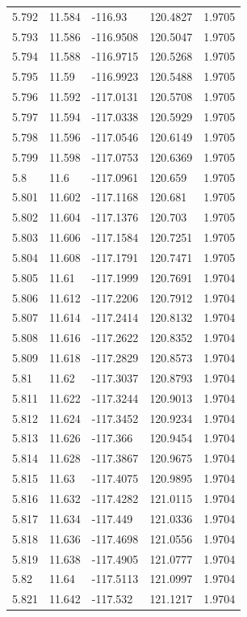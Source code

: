 \begin{tabular}{lllll}
5.792 & 11.584 & -116.93 & 120.4827 & 1.9705 \\
5.793 & 11.586 & -116.9508 & 120.5047 & 1.9705 \\
5.794 & 11.588 & -116.9715 & 120.5268 & 1.9705 \\
5.795 & 11.59 & -116.9923 & 120.5488 & 1.9705 \\
5.796 & 11.592 & -117.0131 & 120.5708 & 1.9705 \\
5.797 & 11.594 & -117.0338 & 120.5929 & 1.9705 \\
5.798 & 11.596 & -117.0546 & 120.6149 & 1.9705 \\
5.799 & 11.598 & -117.0753 & 120.6369 & 1.9705 \\
5.8 & 11.6 & -117.0961 & 120.659 & 1.9705 \\
5.801 & 11.602 & -117.1168 & 120.681 & 1.9705 \\
5.802 & 11.604 & -117.1376 & 120.703 & 1.9705 \\
5.803 & 11.606 & -117.1584 & 120.7251 & 1.9705 \\
5.804 & 11.608 & -117.1791 & 120.7471 & 1.9705 \\
5.805 & 11.61 & -117.1999 & 120.7691 & 1.9704 \\
5.806 & 11.612 & -117.2206 & 120.7912 & 1.9704 \\
5.807 & 11.614 & -117.2414 & 120.8132 & 1.9704 \\
5.808 & 11.616 & -117.2622 & 120.8352 & 1.9704 \\
5.809 & 11.618 & -117.2829 & 120.8573 & 1.9704 \\
5.81 & 11.62 & -117.3037 & 120.8793 & 1.9704 \\
5.811 & 11.622 & -117.3244 & 120.9013 & 1.9704 \\
5.812 & 11.624 & -117.3452 & 120.9234 & 1.9704 \\
5.813 & 11.626 & -117.366 & 120.9454 & 1.9704 \\
5.814 & 11.628 & -117.3867 & 120.9675 & 1.9704 \\
5.815 & 11.63 & -117.4075 & 120.9895 & 1.9704 \\
5.816 & 11.632 & -117.4282 & 121.0115 & 1.9704 \\
5.817 & 11.634 & -117.449 & 121.0336 & 1.9704 \\
5.818 & 11.636 & -117.4698 & 121.0556 & 1.9704 \\
5.819 & 11.638 & -117.4905 & 121.0777 & 1.9704 \\
5.82 & 11.64 & -117.5113 & 121.0997 & 1.9704 \\
5.821 & 11.642 & -117.532 & 121.1217 & 1.9704 \\

\end{tabular}
